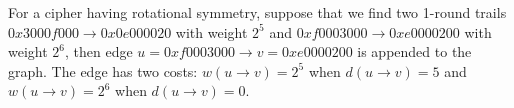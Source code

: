 \begin{example}
	For a cipher having rotational symmetry, suppose that we find two 1-round trails $0x3000f000\rightarrow 0x0e000020$ with weight $2^5$ and $0xf0003000\rightarrow 0xe0000200$ with weight $2^6$, then edge $u=0xf0003000\rightarrow v=0xe0000200$ is appended to the graph. The edge has two costs: $w(u\rightarrow v)=2^5$ when $d(u\rightarrow v)=5$ and $w(u\rightarrow v)=2^6$ when $d(u\rightarrow v)=0$. 
\end{example}
